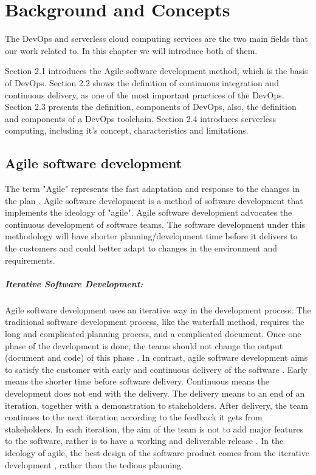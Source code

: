 \chapter{Background and Concepts}
The DevOps and serverless cloud computing services are the two main fields that our work related to. In this chapter we will introduce both of them.
\par
Section 2.1 introduces the Agile software development method, which is the basis of DevOps. Section 2.2 shows the definition of continuous integration and continuous delivery, as one of the most important practices of the DevOps. Section 2.3 presents the definition, components of DevOps, also, the definition and components of a DevOps toolchain. Section 2.4 introduces serverless computing, including it's concept, characteristics and limitations.
\section{Agile software development}
\label{agile}
The term "Agile" represents the fast adaptation and response to the changes in the plan \cite{highsmith2002agile}.
Agile software development is a method of software development that implements the ideology of "agile". Agile software development advocates the continuous development of software teams. The software development under this methodology will have shorter planning/development time before it delivers to the customers and could better adapt to changes in the environment and requirements.
\paragraph{Iterative Software Development:} Agile software development uses an iterative way in the development process. The traditional software development process, like the waterfall method, requires the long and complicated planning process, and a complicated document. Once one phase of the development is done, the teams should not change the output (document and code) of this phase \cite{cusumano1995beyond}. In contrast, agile software development aims to satisfy the customer with early and continuous delivery of the software \cite{beck2001manifesto}. Early means the shorter time before software delivery. Continuous means the development does not end with the delivery. The delivery means to an end of an iteration, together with a demonstration to stakeholders. After delivery, the team continues to the next iteration according to the feedback it gets from stakeholders. In each iteration, the aim of the team is not to add major features to the software, rather is to have a working and deliverable release \cite{beck1999embracing}. In the ideology of agile, the best design of the software product comes from the iterative development \cite{beck2001manifesto}, rather than the tedious planning. 

